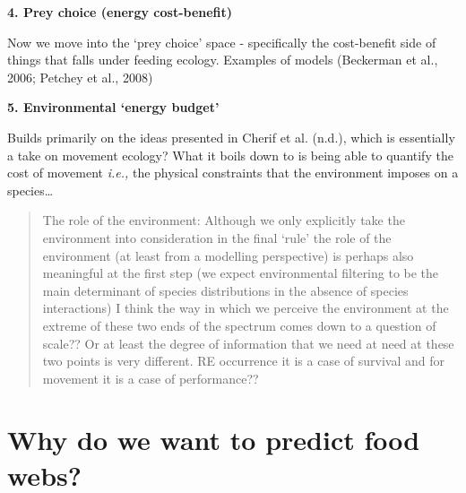 \documentclass[
]{article}
\begin{document}
\begin{tcolorbox}
\textbf{4. Prey choice (energy cost-benefit)}

Now we move into the `prey choice' space - specifically the cost-benefit
side of things that falls under feeding ecology. Examples of models
(Beckerman et al., 2006; Petchey et al., 2008)

\textbf{5. Environmental `energy budget'}

Builds primarily on the ideas presented in Cherif et al. (n.d.), which
is essentially a take on movement ecology? What it boils down to is
being able to quantify the cost of movement \emph{i.e.,} the physical
constraints that the environment imposes on a species\ldots{}

\begin{quote}
The role of the environment: Although we only explicitly take the
environment into consideration in the final `rule' the role of the
environment (at least from a modelling perspective) is perhaps also
meaningful at the first step (we expect environmental filtering to be
the main determinant of species distributions in the absence of species
interactions) I think the way in which we perceive the environment at
the extreme of these two ends of the spectrum comes down to a question
of scale?? Or at least the degree of information that we need at need at
these two points is very different. RE occurrence it is a case of
survival and for movement it is a case of performance??
\end{quote}

\end{tcolorbox}

\section{Why do we want to predict food webs?}\label{sec-network-why}
\end{document}
